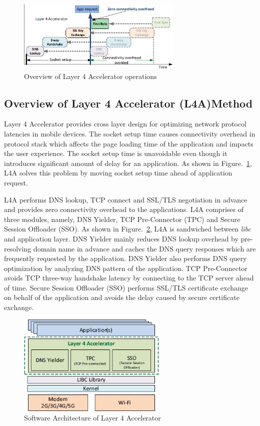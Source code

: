 \begin{multicols}{2}
\begin{figure}[H]
\centering
\includegraphics[scale=3.3]{src/Figures/chap1/chap1-fig06.jpg}
\caption{Overview of Layer 4 Accelerator operations}\label{chap1-fig06}
\end{figure}

\subsection{Overview of Layer 4 Accelerator (L4A)Method}

Layer 4 Accelerator provides cross layer design for optimizing network protocol latencies in mobile devices. The socket setup time causes connectivity overhead in protocol stack which affects the page loading time of the application and impacts the user experience. The socket setup time is unavoidable even though it introduces significant amount of delay for an application. As shown in Figure.~\ref{chap1-fig06}, L4A solves this problem by moving socket setup time ahead of application request.

L4A performs DNS lookup, TCP connect and SSL/TLS negotiation in advance and provides zero connectivity overhead to the applications. L4A comprises of three modules, namely, DNS Yielder, TCP Pre-Connector (TPC) and Secure Session Offloader (SSO). As shown in Figure.~\ref{chap1-fig07}, L4A is sandwiched between \textit{libc} and application layer. DNS Yielder mainly reduces DNS lookup overhead by pre-resolving domain name in advance and caches the DNS query responses which are frequently requested by the application. DNS Yielder also performs DNS query optimization by analyzing DNS pattern of the application. TCP Pre-Connector avoids TCP three-way handshake latency by connecting to the TCP server ahead of time. Secure Session Offloader (SSO) performs SSL/TLS certificate exchange on behalf of the application and avoids the delay caused by secure certificate exchange.

\begin{figure}[H]
\centering
\includegraphics[scale=3]{src/Figures/chap1/chap1-fig07.jpg}
\caption{Software Architecture of Layer 4 Accelerator}\label{chap1-fig07}
\end{figure}


\end{multicols}
